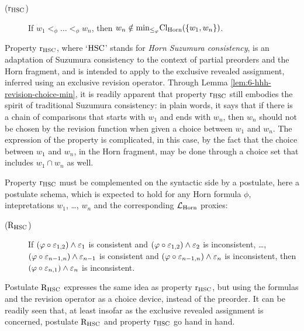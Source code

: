 \begin{description}
	\item[($\mathrm{r}_{{\mathrm{HSC}}}$)] If $w_1 <_{\phi}\dots <_{\phi} w_n$,
		then $w_n\notin {\operatorname{min}}_{\le_{\varphi}}{\operatorname{Cl}}_{\mathrm{Horn}}(\{w_1,w_n\})$.
\end{description}

Property $\mathrm{r}_{{\mathrm{HSC}}}$, where `${\mathrm{HSC}}$' stands for \emph{Horn Suzumura consistency},
is an adaptation of Suzumura consistency to the context of partial 
preorders and the Horn fragment,
and is intended to apply to the exclusive revealed assignment,
inferred using an exclusive revision operator.
Through Lemma \ref{lem:6-hhh-revision-choice-min}, 
it is readily apparent that
property $\mathrm{r}_{{\mathrm{HSC}}}$ still embodies the 
spirit of traditional Suzumura consistency:
in plain words, it says that if there is a chain of comparisons that starts 
with $w_1$ and ends with $w_n$, then $w_n$ should not be chosen
by the revision function when given a choice between $w_1$ and $w_n$.
The expression of the property is complicated, in this case,
by the fact that the choice between $w_1$ and $w_n$, in the Horn fragment,
may be done through a choice set that includes $w_1\cap w_n$ as well.

Property $\mathrm{r}_{{\mathrm{HSC}}}$ must be complemented on the syntactic side 
by a postulate,
here a postulate schema, 
which is expected to hold for any Horn formula $\phi$,
intepretations $w_1$, \dots, $w_n$
and the corresponding $\mathcal{L}_{\mathrm{Horn}}$ proxies:

\begin{description}
	\item[($\mathrm{R}_{{\mathrm{HSC}}}$)]
	If $(\varphi\circ\varepsilon_{1,2})\land\varepsilon_{1}$ is consistent and
		$(\varphi\circ\varepsilon_{1,2})\land\varepsilon_{2}$ is inconsistent,
		\dots,
		$(\varphi\circ\varepsilon_{n-1,n})\land\varepsilon_{n-1}$ is consistent and
		$(\varphi\circ\varepsilon_{n-1,n})\land\varepsilon_{n}$ is inconsistent,
	then $(\varphi\circ\varepsilon_{n,1})\land\varepsilon_{n}$ is inconsistent.
\end{description}

Postulate $\mathrm{R}_{{\mathrm{HSC}}}$ expresses the same idea as property $\mathrm{r}_{{\mathrm{HSC}}}$,
but using the formulas and the revision operator as a choice device,
instead of the preorder.
It can be readily seen that, at least insofar as the exclusive revealed assignment
is concerned, postulate $\mathrm{R}_{{\mathrm{HSC}}}$ and property $\mathrm{r}_{{\mathrm{HSC}}}$ go hand in hand.

